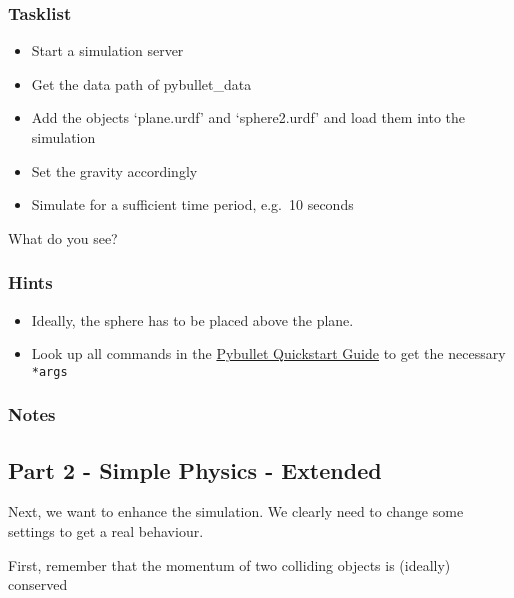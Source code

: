\hypertarget{tasklist}{%
\subsubsection{Tasklist}\label{tasklist}}

\begin{itemize}
\tightlist
\item
  Start a simulation server
\item
  Get the data path of pybullet\_data
\item
  Add the objects `plane.urdf' and `sphere2.urdf' and load them into the
  simulation
\item
  Set the gravity accordingly
\item
  Simulate for a sufficient time period, e.g.~10 seconds
\end{itemize}

What do you see?

\hypertarget{hints}{%
\subsubsection{Hints}\label{hints}}

\begin{itemize}
\tightlist
\item
  Ideally, the sphere has to be placed above the plane.
\item
  Look up all commands in the
  \href{https://docs.google.com/document/d/10sXEhzFRSnvFcl3XxNGhnD4N2SedqwdAvK3dsihxVUA/edit\#heading=h.2ye70wns7io3}{Pybullet
  Quickstart Guide} to get the necessary \texttt{*args}
\end{itemize}

\hypertarget{notes}{%
\subsubsection{Notes}\label{notes}}

\pagebreak

\hypertarget{part-2---simple-physics---extended}{%
\subsection{Part 2 - Simple Physics -
Extended}\label{part-2---simple-physics---extended}}

Next, we want to enhance the simulation. We clearly need to change some
settings to get a real behaviour.

First, remember that the momentum of two colliding objects is (ideally)
conserved

